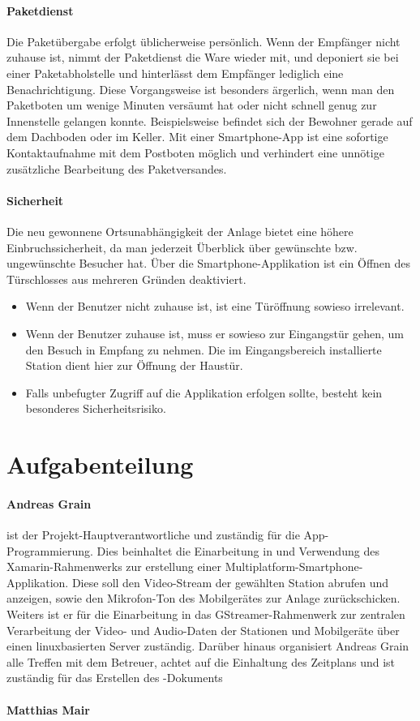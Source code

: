 \paragraph{Paketdienst}
Die Paketübergabe erfolgt üblicherweise persönlich.
Wenn der Empfänger nicht zuhause ist, nimmt der Paketdienst die Ware wieder mit, und deponiert sie bei einer Paketabholstelle und hinterlässt dem Empfänger lediglich eine Benachrichtigung.
Diese Vorgangsweise ist besonders ärgerlich, wenn man den Paketboten um wenige Minuten versäumt hat oder nicht schnell genug zur Innenstelle gelangen konnte.
Beispielsweise befindet sich der Bewohner gerade auf dem Dachboden oder im Keller.
Mit einer Smartphone-App ist eine sofortige Kontaktaufnahme mit dem Postboten möglich und verhindert eine unnötige zusätzliche Bearbeitung des Paketversandes.

\paragraph{Sicherheit}
Die neu gewonnene Ortsunabhängigkeit der Anlage bietet eine höhere Einbruchssicherheit, da man jederzeit Überblick über gewünschte bzw. ungewünschte Besucher hat.
Über die Smartphone-Applikation ist ein Öffnen des Türschlosses aus mehreren Gründen deaktiviert.
\begin{itemize}
    \item Wenn der Benutzer nicht zuhause ist, ist eine Türöffnung sowieso irrelevant.
    \item Wenn der Benutzer zuhause ist, muss er sowieso zur Eingangstür gehen, um den Besuch in Empfang zu nehmen. Die im Eingangsbereich installierte Station dient hier zur Öffnung der Haustür.
    \item Falls unbefugter Zugriff auf die Applikation erfolgen sollte, besteht kein besonderes Sicherheitsrisiko.
\end{itemize}

\section{Aufgabenteilung}
\paragraph{Andreas Grain} ist der Projekt-Hauptverantwortliche und zuständig für die App-Program\-mierung.
Dies beinhaltet die Einarbeitung in und Verwendung des Xamarin-Rahmenwerks zur erstellung einer Multiplatform-Smartphone-Applikation.
Diese soll den Video-Stream der gewählten Station abrufen und anzeigen, sowie den Mikrofon-Ton des Mobilgerätes zur Anlage zurückschicken.
Weiters ist er für die Einarbeitung in das GStreamer-Rahmenwerk zur zentralen Verarbeitung der Video- und Audio-Daten der Stationen und Mobilgeräte über einen linuxbasierten Server zuständig.
Darüber hinaus organisiert Andreas Grain alle Treffen mit dem Betreuer, achtet auf die Einhaltung des Zeitplans und ist zuständig für das Erstellen des  -Dokuments

\paragraph{Matthias Mair}